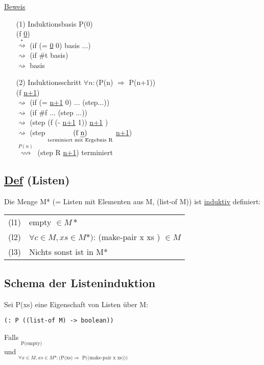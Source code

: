\documentclass[a4paper,12pt]{article}
\begin{document}
\uline{Beweis}\\
\begin{itemize}
\item[(1)] Induktionsbasis P(0)\\
(f \uline{0})\\
$\overset{*}{\rightsquigarrow}$ (if (= \uline{0} 0) basis ...)\\
$\rightsquigarrow$ (if \#t basis)\\
$\rightsquigarrow$ basis \checkmark\\
\item[(2)] Induktionsschritt $\forall n:$(P(n) $\Rightarrow$ P(n+1))\\
(f \uline{n+1})\\
$\rightsquigarrow$ (if (= \uline{n+1} 0) ... (step...))\\
$\rightsquigarrow$ (if \#f ... (step ...))\\
$\rightsquigarrow$ (step (f (- \uline{n+1} 1)) \uline{n+1} )\\
$\rightsquigarrow$ (step $\underset{\text{terminiert mit Ergebnis R}}{\text{(f \uline{n})}}$ \uline{n+1})\\
$\overset{P(n)}{\rightsquigarrow}$ (step R \uline{n+1}) terminiert \checkmark\\
\end{itemize}

\subsection{\uline{Def} (Listen)}
Die Menge M* (= Listen mit Elementen aus M, (list-of M)) ist \uline{induktiv} definiert:
\begin{tabular}{ll}
(l1) & empty $\in M*$\\
(l2) & $\forall c \in M, xs \in M*)$: (make-pair x xs ) $\in M$\\
(l3) & Nichts sonst ist in M*
\end{tabular}
\subsection{Schema der Listeninduktion}
Sei P(xs) eine Eigenschaft von Listen über M:
\begin{lstlisting}[style=customc]
(: P ((list-of M) -> boolean))
\end{lstlisting}

Falls $\underset{\text{P(empty)}}{}$\\
und $\underset{\forall x \in M, xs \in M*:\text{(P(xs)} \Rightarrow \text{ P((make-pair x xs)))}}{}$\\
\end{document}
